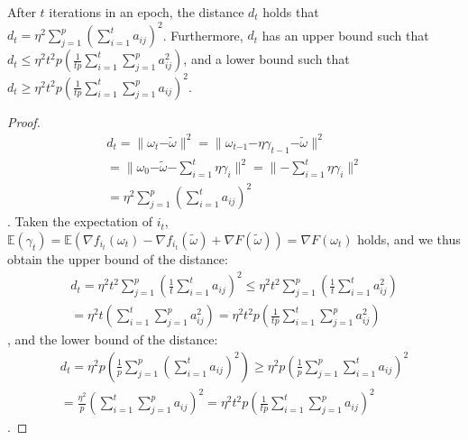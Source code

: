 \documentclass[letterpaper]{article}
\begin{document}
\begin{Theorem}
\label{theorem_vr_lower_bound}
   After $t$ iterations in an epoch, the distance $d_t$ holds that $d_t \mathrm{=} \eta^2 \sum\limits_{j=1}^p\left(  \sum\limits_{i=1}^t a_{ij}  \right)^2$. Furthermore, $d_t$ has an upper bound such that 
   $d_t \mathrm{\le} \eta^2 t^2p  \left( \frac{1}{tp}\sum\limits_{i=1}^t   \sum\limits_{j=1}^p   a_{ij}^2 \right)$, and a lower bound such that $d_t  \mathrm{\ge} \eta^2t^2p \left(\frac{1}{tp}\sum\limits_{i=1}^t   \sum\limits_{j=1}^p   a_{ij}\right)^2$.
\end{Theorem}
\begin{proof}
\begin{equation}
\begin{array}{ll}
d_{t} = \parallel \omega_{t}\mathrm{-}\tilde{\omega} \parallel^2 
=\parallel \omega_{{t\mathrm{-}1}}\mathrm{-}\eta \gamma_{t-1} \mathrm{-}\tilde{\omega} \parallel^2\\
= \parallel \omega_{0}\mathrm{-}\tilde{\omega}  \mathrm{-} \sum\limits_{i=1}^t \eta \gamma_i \parallel^2 
=\parallel \mathrm{-}\sum\limits_{i=1}^t \eta \gamma_i \parallel^2\\
= \eta^2 \sum\limits_{j=1}^p\left(  \sum\limits_{i=1}^t a_{ij}  \right)^2
\end{array}
\end{equation}. Taken the expectation of $i_t$,  $\mathbb{E}(\gamma_t) = \mathbb{E}(\nabla f_{i_t}(\omega_t)-\nabla f_{i_t}(\tilde{\omega})+\nabla F(\tilde{\omega})) = \nabla F(\omega_{t})$ holds,   and we thus obtain the upper bound of the distance:
\begin{equation}
\begin{array}{ll}
d_{t} = \eta^2 t^2 \sum\limits_{j=1}^p\left( \frac{1}{t} \sum\limits_{i=1}^t a_{ij}  \right)^2
\le \eta^2 t^2 \sum\limits_{j=1}^p\left( \frac{1}{t} \sum\limits_{i=1}^t a_{ij}^2  \right)\\
= \eta^2 t  \left( \sum\limits_{i=1}^t   \sum\limits_{j=1}^p   a_{ij}^2 \right) 
= \eta^2 t^2p  \left( \frac{1}{tp}\sum\limits_{i=1}^t   \sum\limits_{j=1}^p   a_{ij}^2 \right)
\end{array}
\end{equation}, and the lower bound of the distance:
\begin{equation}
\begin{array}{ll}
d_{t} = \eta^2 p \left( \frac{1}{p} \sum\limits_{j=1}^p\left( \sum\limits_{i=1}^t a_{ij}  \right)^2\right)
\ge \eta^2 p \left(  \frac{1}{p}  \sum\limits_{j=1}^p \sum\limits_{i=1}^t a_{ij}  \right)^2\\
= \frac{\eta^2}{p} \left(\sum\limits_{i=1}^t   \sum\limits_{j=1}^p   a_{ij}\right)^2  
= \eta^2t^2p \left(\frac{1}{tp}\sum\limits_{i=1}^t   \sum\limits_{j=1}^p   a_{ij}\right)^2
\end{array}
\end{equation}.
\end{proof}
\end{document}
